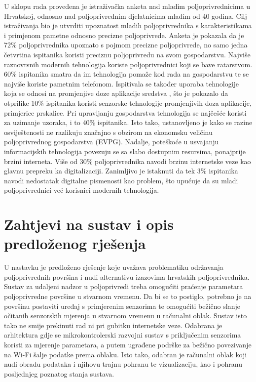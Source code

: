 U sklopu rada \cite{arapovic} provedena je istraživačka anketa nad mladim poljoprivrednicima u Hrvatskoj, odnosno nad poljoprivrednim djelatnicima mlađim od 40 godina. Cilj istraživanja bio je utvrditi upoznatost mladih poljoprivrednika s karakteristikama i primjenom pametne odnosno precizne poljoprivrede. Anketa je pokazala da je 72\% poljoprivrednika upoznato s pojmom precizne poljoprivrede, no samo jedna četvrtina ispitanika koristi preciznu poljoprivredu na svom gospodarstvu. Najviše raznovrsnih modernih tehnologija koriste poljoprivrednici koji se bave ratarstvom. 60\% ispitanika smatra da im tehnologija pomaže kod rada na gospodarstvu te se najviše koriste pametnim telefonom. Ispitivala se također uporaba tehnologije koja se odnosi na promjenjive doze aplikacije sredstva , što je pokazalo da otprilike 10\% ispitanika koristi senzorske tehnologije promjenjivih doza aplikacije, primjerice prskalice. Pri upravljanju gospodarstva tehnologija se najčešće koristi za uzimanje uzoraka, i to 40\% ispitanika. Isto tako, ustanovljeno je kako se razine osviještenosti ne razlikuju značajno s obzirom na ekonomsku veličinu poljoprivrednog gospodarstva (EVPG). Nadalje, poteškoće u usvajanju informacijskih tehnologija povezuju se sa slabo dostupnim resursima, ponajprije brzini interneta. Više od 30\% poljoprivrednika navodi brzinu internetske veze kao glavnu prepreku ka digitalizaciji. Zanimljivo je istaknuti da tek 3\% ispitanika navodi nedostatak digitalne pismenosti kao problem, što upućuje da su mladi poljoprivrednici već korisnici modernih tehnologija. 


\section{Zahtjevi na sustav i opis predloženog rješenja}

U nastavku je predloženo rješenje koje uvažava problematiku održavanja poljoprivrednih površina i nudi alternativu izazovima hrvatskih poljoprivrednika. Sustav za udaljeni nadzor u poljoprivredi treba omogućiti praćenje parametara poljoprivredne površine u stvarnom vremenu. Da bi se to postiglo, potrebno je na površinu postaviti uređaj s primjerenim senzorima te omogućiti bežično slanje očitanih senzorskih mjerenja u stvarnom vremenu u računalni oblak. Sustav isto tako ne smije prekinuti rad ni pri gubitku internetske veze. Odabrana je arhitektura gdje se mikrokontrolerski razvojni sustav s priključenim senzorima koristi za mjerenje parametara, a putem ugrađene podrške za bežično povezivanje na Wi-Fi šalje podatke prema oblaku. Isto tako, odabran je računalni oblak koji nudi obradu podataka i njihovu trajnu pohranu te vizualizaciju, kao i pohranu posljednjeg poznatog stanja sustava.


